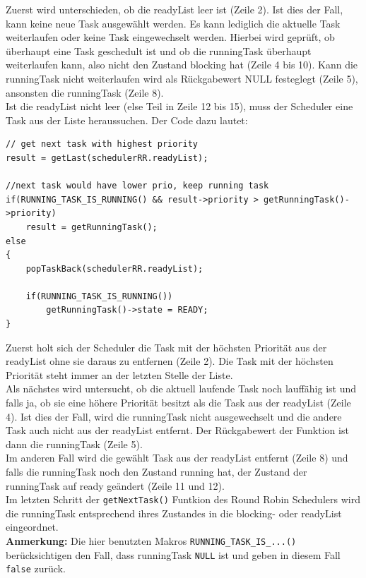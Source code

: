 \documentclass[fontsize=12pt, toc=bibliography, notitlepage]{scrreprt}
\begin{document}
Zuerst wird unterschieden, ob die readyList leer ist (Zeile 2). Ist dies der Fall, kann keine neue Task ausgewählt werden. Es kann lediglich die aktuelle Task weiterlaufen oder keine Task eingewechselt werden. Hierbei wird geprüft, ob überhaupt eine Task geschedult ist und ob die runningTask überhaupt weiterlaufen kann, also nicht den Zustand blocking hat (Zeile 4 bis 10). Kann die runningTask nicht weiterlaufen wird als Rückgabewert NULL festeglegt (Zeile 5), ansonsten die runningTask (Zeile 8).\\

Ist die readyList nicht leer (else Teil in Zeile 12 bis 15), muss der Scheduler eine Task aus der Liste heraussuchen. Der Code dazu lautet:

\begin{lstlisting}[title=schedulerRR.c]
// get next task with highest priority
result = getLast(schedulerRR.readyList);

//next task would have lower prio, keep running task
if(RUNNING_TASK_IS_RUNNING() && result->priority > getRunningTask()->priority)
	result = getRunningTask();
else
{
	popTaskBack(schedulerRR.readyList);
	
	if(RUNNING_TASK_IS_RUNNING())
		getRunningTask()->state = READY;
}
\end{lstlisting}

Zuerst holt sich der Scheduler die Task mit der höchsten Priorität aus der readyList ohne sie daraus zu entfernen (Zeile 2). Die Task mit der höchsten Priorität steht immer an der letzten Stelle der Liste.\\
Als nächstes wird untersucht, ob die aktuell laufende Task noch lauffähig ist und falls ja, ob sie eine höhere Priorität besitzt als die Task aus der readyList (Zeile 4). Ist dies der Fall, wird die runningTask nicht ausgewechselt und die andere Task auch nicht aus der readyList entfernt. Der Rückgabewert der Funktion ist dann die runningTask (Zeile 5).\\
Im anderen Fall wird die gewählt Task aus der readyList entfernt (Zeile 8) und falls die runningTask noch den Zustand running hat, der Zustand der runningTask auf ready geändert (Zeile 11 und 12).\\

Im letzten Schritt der \lstinline$getNextTask()$ Funtkion des Round Robin Schedulers wird die runningTask entsprechend ihres Zustandes in die blocking- oder readyList eingeordnet.\\

\textbf{Anmerkung:} Die hier benutzten Makros \lstinline$RUNNING_TASK_IS_...()$ berücksichtigen den Fall, dass runningTask \lstinline$NULL$ ist und geben in diesem Fall \lstinline$false$ zurück.
\end{document}
